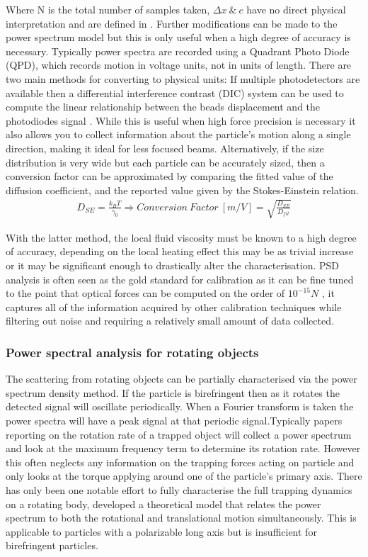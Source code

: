 Where N is the total number of samples taken, $\Delta x \ \& \ c$ 
have no direct physical interpretation and are defined in 
\cite{BergSoerensen2004}. Further modifications can be made to the 
power spectrum model but this is only useful when a high degree of 
accuracy is necessary. Typically power spectra are recorded using 
a Quadrant Photo Diode (QPD), which records motion in voltage units, 
not in units of length. There are two main methods for converting to
physical units: If multiple photodetectors are available then a 
differential interference contrast (DIC) system can be used to 
compute the linear relationship between the beads displacement and 
the photodiodes signal \cite{Capitanio2002}. While this is useful 
when high force precision is necessary it also allows you to collect information about the particle's motion along a single direction, 
making it ideal for less focused beams. Alternatively, if the size distribution is very wide but each particle can be accurately sized, 
then a conversion factor can be approximated by comparing the fitted 
value of the diffusion coefficient, and the reported value given by 
the Stokes-Einstein relation.
\begin{align}
	\label{eq:conversion_factor}
	D_{SE} = \frac{k_BT}{\gamma_0} \Rightarrow Conversion\ Factor \ [m/V]= \sqrt{\frac{D_{SE}}{D_{fit}}}
\end{align}

With the latter method, the local fluid viscosity must be known to a 
high degree of accuracy, depending on the local heating effect this 
may be as trivial increase or it may be significant enough to drastically 
alter the characterisation. PSD analysis is often seen as the gold 
standard for calibration as it can be fine tuned to the point that 
optical forces can be computed on the order of $10^{-15} N$ 
\cite{BergSoerensen2004}, it captures all of the information acquired 
by other calibration techniques while filtering out noise and requiring 
a relatively small amount of data collected. 

\subsubsection{Power spectral analysis for rotating objects}
The scattering from rotating objects can be partially characterised via
the power spectrum density method. If the particle is birefringent then
as it rotates the detected signal will oscillate periodically. When a 
Fourier transform is taken the power spectra will have a peak signal at 
that periodic signal.Typically papers reporting on the rotation rate of 
a trapped object will collect a power spectrum and look at the maximum frequency term to determine its rotation rate. However this often neglects 
any information on the trapping forces acting on particle and only looks 
at the torque applying around one of the particle's primary axis. There 
has only been one notable effort to fully characterise the full trapping dynamics on a rotating body, \cite{Yogesha2012} developed a theoretical 
model that relates the power spectrum to both the rotational and 
translational motion simultaneously. This is applicable to particles with
a polarizable long axis but is insufficient for birefringent particles.

